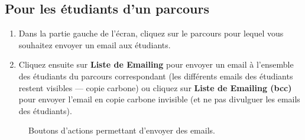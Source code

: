 \documentclass[letterpaper,10pt,french]{sphinxmanual}
\begin{document}
\subsection{Pour les étudiants d'un parcours}
\label{prof:pour-les-etudiants-d-un-parcours}\begin{enumerate}
\item {} 
Dans la partie gauche de l'écran, cliquez sur le parcours pour lequel vous souhaitez envoyer un email aux étudiants.

\item {} 
Cliquez ensuite sur \textbf{Liste de Emailing} pour envoyer un email à l'ensemble des étudiants du parcours correspondant (les différents emails des étudiants restent visibles — copie carbone) ou cliquez sur \textbf{Liste de Emailing (bcc)} pour envoyer l'email en copie carbone invisible (et ne pas divulguer les emails des étudiants).

\end{enumerate}
\begin{figure}[htbp]
\centering
\capstart

\caption{Boutons d'actions permettant d'envoyer des emails.}\end{figure}
\end{document}
